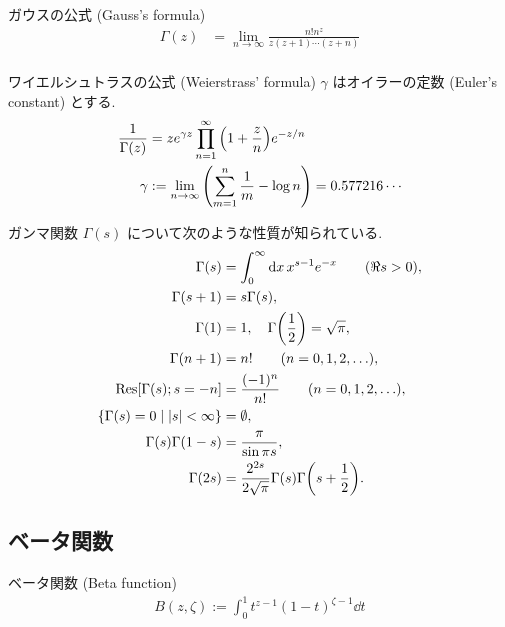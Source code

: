 \documentclass[uplatex,dvipdfmx,a4paper,11pt]{jlreq}
\theoremstyle{definition}
\begin{document}
\begin{proposition}
  ガウスの公式 (Gauss's formula)
  \begin{align}
    \Gamma(z) & = \lim_{n\to\infty}\frac{n!n^z}{z(z+1)\cdots(z+n)} \\
  \end{align}
\end{proposition}
\begin{proposition}
  ワイエルシュトラスの公式 (Weierstrass' formula) $\gamma$ はオイラーの定数 (Euler's constant) とする.
  \begin{align}
    \frac{1}{\Gamma(z)} & = ze^{\gamma z}\prod_{n=1}^{\infty}\qty(1 + \frac{z}{n})e^{-z/n}              \\
    \gamma              & := \lim_{n\to\infty}\qty(\sum_{m=1}^{n}\frac{1}{m} - \log n) = 0.577216\cdots
  \end{align}
\end{proposition}
ガンマ関数 $\Gamma(s)$ について次のような性質が知られている.
\begin{align}
  \Gamma(s)                                    & = \int_0^\infty \dd{x}x^{s-1}e^{-x} \qquad (\real s > 0),         \\
  \Gamma(s + 1)                                & = s\Gamma(s),                                                     \\
  \Gamma(1)                                    & = 1, \quad \Gamma\qty(\frac{1}{2}) = \sqrt{\pi},                  \\
  \Gamma(n + 1)                                & = n! \qquad (n = 0,1,2,\ldots),                                   \\
  \Res[\Gamma(s); s = -n]                      & = \frac{(-1)^n}{n!} \qquad (n = 0,1,2,\ldots),                    \\
  \lbrace\Gamma(s) = 0\mid |s| < \infty\rbrace & = \emptyset,                                                      \\
  \Gamma(s)\Gamma(1-s)                         & = \frac{\pi}{\sin\pi s},                                          \\
  \Gamma(2s)                                   & = \frac{2^{2s}}{2\sqrt{\pi}}\Gamma(s)\Gamma\qty(s + \frac{1}{2}).
\end{align}

\subsection{ベータ関数}
\begin{definition}
  ベータ関数 (Beta function)
  \begin{align}
    B(z, \zeta) := \int_{0}^{1}t^{z-1}(1-t)^{\zeta-1}\dd{t}
  \end{align}
\end{definition}
\end{document}
